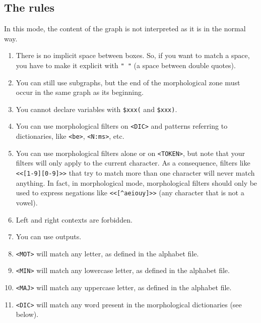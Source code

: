 \subsection{The rules}
In this mode, the content of the graph is not interpreted as it is
in the normal way.
\begin{enumerate}
  \item There is no implicit space between boxes. So, if you
want to match a space, you have to make it explicit with \verb+" "+ (a space
between double quotes).

   \item You can still use subgraphs, but the end of the morphological zone
   must occur in the same graph as its beginning.

   \item You cannot declare variables with \verb+$xxx(+ and \verb+$xxx)+.

   \item You can use morphological filters on \verb+<DIC>+ and patterns
   referring to dictionaries, like \verb+<be>+, \verb+<N:ms>+, etc. 
   
   \item You can use morphological filters alone or on \verb+<TOKEN>+,
   but note that your filters will only apply to the current character. As a
   consequence, filters like \verb+<<[1-9][0-9]>>+ that try to match more than
   one character will never match anything. In fact, in morphological mode, 
   morphological filters should only be used to express negations like 
   \verb+<<[^aeiouy]>>+ (any character that is not a vowel). 
   
   
   \item Left and right contexts are forbidden.

   \item You can use outputs.
   
    \item \verb+<MOT>+ will match any letter, as defined in the alphabet
    file.

    \item \verb+<MIN>+ will match any lowercase letter, as defined in the
    alphabet file.

    \item \verb+<MAJ>+ will match any uppercase letter, as defined in the
    alphabet file.

    \item \verb+<DIC>+ will match any word present in the morphological
    dictionaries (see below).


\end{enumerate}
